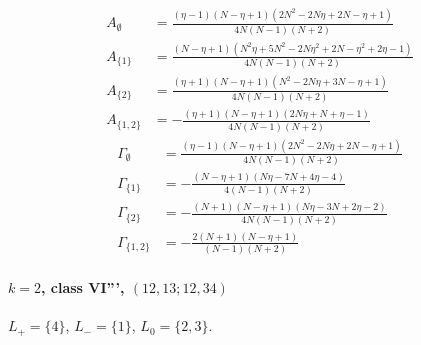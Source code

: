 \documentclass[11pt]{article}
\begin{document}
\begin{align*}
  A_{\emptyset} &= \frac{\left(\eta - 1\right) \left(N - \eta + 1\right) \left(2 N^{2} - 2 N \eta + 2 N - \eta + 1\right)}{4 N \left(N - 1\right) \left(N + 2\right)} \\
  A_{\{1\}} &= \frac{\left(N - \eta + 1\right) \left(N^{2} \eta + 5 N^{2} - 2 N \eta^{2} + 2 N - \eta^{2} + 2 \eta - 1\right)}{4 N \left(N - 1\right) \left(N + 2\right)} \\
  A_{\{2\}} &= \frac{\left(\eta + 1\right) \left(N - \eta + 1\right) \left(N^{2} - 2 N \eta + 3 N - \eta + 1\right)}{4 N \left(N - 1\right) \left(N + 2\right)} \\
  A_{\{1,2\}} &= - \frac{\left(\eta + 1\right) \left(N - \eta + 1\right) \left(2 N \eta + N + \eta - 1\right)}{4 N \left(N - 1\right) \left(N + 2\right)} 
\end{align*}
\begin{align*}
  \Gamma_{\emptyset} &= \frac{\left(\eta - 1\right) \left(N - \eta + 1\right) \left(2 N^{2} - 2 N \eta + 2 N - \eta + 1\right)}{4 N \left(N - 1\right) \left(N + 2\right)} \\
  \Gamma_{\{1\}} &= - \frac{\left(N - \eta + 1\right) \left(N \eta - 7 N + 4 \eta - 4\right)}{4 \left(N - 1\right) \left(N + 2\right)} \\
  \Gamma_{\{2\}} &= - \frac{\left(N + 1\right) \left(N - \eta + 1\right) \left(N \eta - 3 N + 2 \eta - 2\right)}{4 N \left(N - 1\right) \left(N + 2\right)} \\
  \Gamma_{\{1,2\}} &= - \frac{2 \left(N + 1\right) \left(N - \eta + 1\right)}{\left(N - 1\right) \left(N + 2\right)} 
\end{align*}

\paragraph{$k=2$, class VI''', $(12,13;12,34)$}

$L_+=\{4\}$, $L_-=\{1\}$, $L_0=\{2,3\}$.
\end{document}
